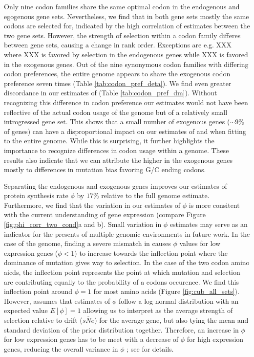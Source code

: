 \documentclass[12pt]{article}
\begin{document}
Only nine codon families share the same optimal codon in the endogenous and egogenous gene sets.
Nevertheless, we find that in both gene sets mostly the same codons are selected for, indicated by the high correlation of \DE estimates between the two gene sets.
However, the strength of selection within a codon family differes between gene sets, causing a change in rank order.
Exceptions are e.g. XXX where XXX is favored by selection in the endogenous genes while XXX is favored in the exogenous genes.
Out of the nine synonymous codon families with differing codon preferences, the entire \kluyveri genome appears to share the exogenous codon preference seven times (Table \ref{tab:codon_pref_deta}).
We find even greater discordance in our estimates of \DM (Table \ref{tab:codon_pref_dm}).
Without recognizing this difference in codon preference our estimates would not have been reflective of the actual codon usage of the \kluyveri genome but of a relatively small introgressed gene set.
This shows that a small number of exogenous genes ($\sim 9 \%$ of genes) can have a disproportional impact on our estimates of \DM and \DE when fitting \ROC to the entire \kluyveri genome.
While this is surprising, it further highlights the importance to recognize differences in codon usage within a genome.
These results also indicate that we can attribute the higher \GC in the exogenous genes mostly to differences in mutation bias favoring G/C ending codons.

Separating the endogenous and exogenous genes improves our estimates of protein synthesis rate $\phi$ by $17 \%$ relative to the full genome estimate.
Furthermore, we find that the variation in our estimates of $\phi$ is more consitent with the current understanding of gene expression (compare Figure \ref{fig:phi_corr_two_cond}a and b). 
Small variation in $\phi$ estimates may serve as an indicator for the presents of multiple genomic environments in future work.
In the case of the \kluyveri genome, finding a severe mismatch in \DM causes $\phi$ values for low expression genes ($\phi < 1$) to increase towards the inflection point where the dominance of mutation gives way to selection.
In the case of the two codon amino aicds, the inflection point represents the point at which mutation and selection are contributing equally to the probability of a codons occurence.
We find this inflection point around $\phi = 1$ for most amino acids (Figure \ref{fig:cub_all_sets}). 
However, \ROC assumes that estimates of $\phi$ follow a log-normal distribution with an expected value $E[\phi] = 1$ allowing us to interpret \DE as the average strength of selection relative to drift ($\overline{sNe}$) for the average gene, but also tying the mean and standard deviation of the prior distribution together.
Therefore, an increase in $\phi$ for low expression genes has to be meet with a decrease of $\phi$ for high expression genes, reducing the overall variance in $\phi$ ; see \citet{gilchrist2015} for details. 
\end{document}
